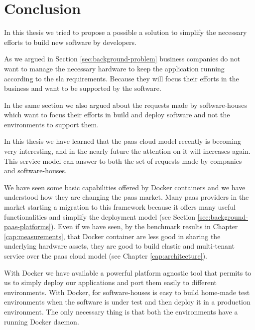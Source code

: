 %
%
\section{Conclusion}
\label{sec:architecture-conclusion}
In this thesis we tried to propose a possible a solution to simplify the necessary efforts to build
new software by developers.

As we argued in Section \ref{sec:background-problem} business companies do not want to manage the
necessary hardware to keep the application running according to the \ac{sla} requirements. Because
they will focus their efforts in the business and want to be supported by the software.

In the same section we also argued about the requests made by software-houses which want to focus
their efforts in build and deploy software and not the environments to support them.

In this thesis we have learned that the \ac{paas} cloud model recently is becoming very interesting,
and in the nearly future the attention on it will increases again. This service model can answer to
both the set of requests made by companies and software-houses.

We have seen some basic capabilities offered by Docker containers and we have understood how they are
changing the \ac{paas} market. Many \ac{paas} providers in the market starting a migration to this
framework because it offers many useful functionalities and simplify the deployment model (see Section
\ref{sec:background-paas-platforms}). Even if we have seen, by the benchmark results in Chapter
\ref{cap:measurements}, that Docker container are less good in sharing the underlying hardware
assets, they are good to build elastic and multi-tenant service over the \ac{paas} cloud model
(see Chapter \ref{cap:architecture}).

With Docker we have available a powerful platform agnostic tool that permits to us to simply deploy
our applications and port them easily to different environments. With Docker, for software-houses
is easy to build home-made test environments when the software is under test and then deploy it in
a production environment. The only necessary thing is that both the environments have a running
Docker daemon.
